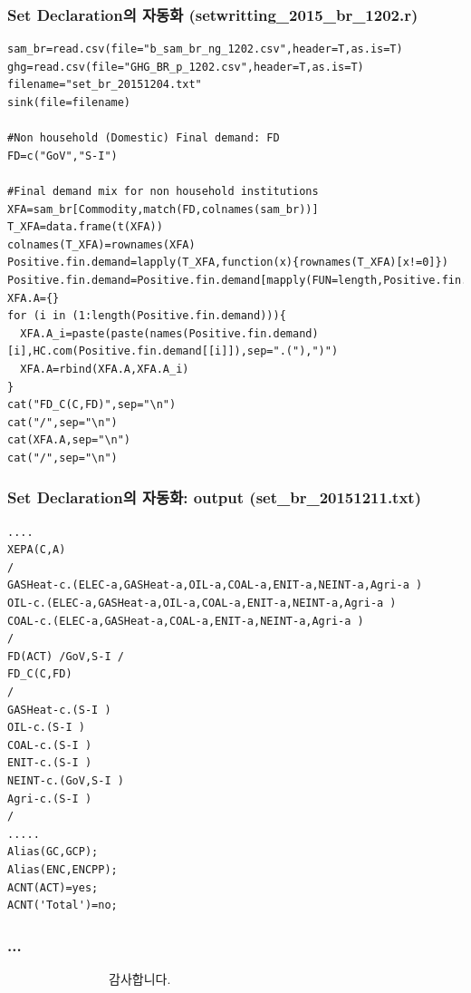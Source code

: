 \documentclass{beamer}
\begin{document}
\begin{frame}[fragile]
	\frametitle{Set Declaration의 자동화 (setwritting\_2015\_br\_1202.r)}

\begin{scriptsize}
\begin{verbatim}
sam_br=read.csv(file="b_sam_br_ng_1202.csv",header=T,as.is=T)
ghg=read.csv(file="GHG_BR_p_1202.csv",header=T,as.is=T)
filename="set_br_20151204.txt"
sink(file=filename)

#Non household (Domestic) Final demand: FD
FD=c("GoV","S-I")

#Final demand mix for non household institutions   
XFA=sam_br[Commodity,match(FD,colnames(sam_br))]
T_XFA=data.frame(t(XFA))
colnames(T_XFA)=rownames(XFA)
Positive.fin.demand=lapply(T_XFA,function(x){rownames(T_XFA)[x!=0]})
Positive.fin.demand=Positive.fin.demand[mapply(FUN=length,Positive.fin.demand)>0]
XFA.A={}
for (i in (1:length(Positive.fin.demand))){
  XFA.A_i=paste(paste(names(Positive.fin.demand)[i],HC.com(Positive.fin.demand[[i]]),sep=".("),")")
  XFA.A=rbind(XFA.A,XFA.A_i)
}
cat("FD_C(C,FD)",sep="\n")
cat("/",sep="\n")
cat(XFA.A,sep="\n")
cat("/",sep="\n")

\end{verbatim}
\end{scriptsize}
\end{frame}

\begin{frame}[fragile]
	\frametitle{Set Declaration의 자동화: output (set\_br\_20151211.txt)}

\begin{scriptsize}
\begin{verbatim}
....
XEPA(C,A)
/
GASHeat-c.(ELEC-a,GASHeat-a,OIL-a,COAL-a,ENIT-a,NEINT-a,Agri-a )
OIL-c.(ELEC-a,GASHeat-a,OIL-a,COAL-a,ENIT-a,NEINT-a,Agri-a )
COAL-c.(ELEC-a,GASHeat-a,COAL-a,ENIT-a,NEINT-a,Agri-a )
/
FD(ACT) /GoV,S-I /
FD_C(C,FD)
/
GASHeat-c.(S-I )
OIL-c.(S-I )
COAL-c.(S-I )
ENIT-c.(S-I )
NEINT-c.(GoV,S-I )
Agri-c.(S-I )
/
.....
Alias(GC,GCP);
Alias(ENC,ENCPP);
ACNT(ACT)=yes;
ACNT('Total')=no;
\end{verbatim}
\end{scriptsize}
\end{frame}
\begin{frame}[fragile]
\frametitle{...}
\bigskip
\bigskip
\bigskip
\bigskip
\begin{Huge}
$\qquad$$\qquad$$\qquad$$\qquad$감사합니다.
\end{Huge}
\end{frame}
\end{document}
